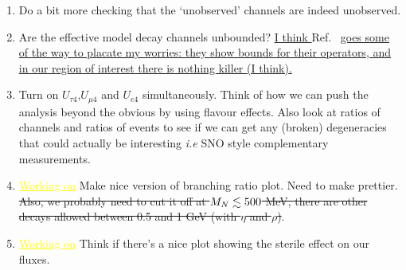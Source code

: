\documentclass[11pt, a4paper]{article}
\newcommand{\refref}[1]{Ref.~\cite{#1}}
\def\ster{\ensuremath N}
\newcommand{\newtext}[2]{\textcolor{#1}{\ul{#2}}}
\begin{document}
\begin{enumerate}

\item Do a bit more checking that the `unobserved' channels are indeed unobserved. 

\item Are the effective model decay channels unbounded? \newtext{PB}{I think } \refref{Aparici:2009fh} \newtext{PB}{goes some of the way to placate my worries: they show bounds for their operators, and in our region of interest there is nothing killer (I think).}

\item Turn on $U_{\tau 4}$,$U_{\mu 4}$ and $U_{e4}$ simultaneously. Think of
how we can push the analysis beyond the obvious by using flavour effects. Also
look at ratios of channels and ratios of events to see if we can get any
(broken) degeneracies that could actually be interesting \emph{i.e} SNO style
complementary measurements.

\item \newtext{MARK}{Working on} Make nice version of branching ratio plot.
Need to make prettier. \sout{Also, we probably need to cut it off at
$M_\ster\lesssim 500$ MeV, there are other decays allowed between 0.5 and 1 GeV
(with $\eta$ and $\rho$)}.

\item \newtext{MARK}{Working on} Think if there's a nice plot showing the
sterile effect on our fluxes.

\end{enumerate}



{}
\end{document}
